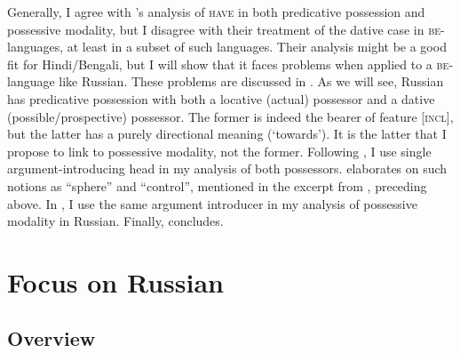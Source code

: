 \documentclass[output=paper,colorlinks,citecolor=brown,modfonts,nonflat]{langsci/langscibook}
\begin{document}
Generally, I agree with \citeauthor{BjorkmanCowper2016}’s analysis of \textsc{have} in both predicative possession and possessive modality, but I disagree with their treatment of the dative case in \textsc{be}{}-languages, at least in a subset of such languages. Their analysis might be a good fit for Hindi/Bengali, but I will show that it faces problems when applied to a \textsc{be}-language like Russian. These problems are discussed in . As we will see, Russian has predicative possession with both a locative (actual) possessor and a dative (possible/prospective) possessor. The former is indeed the bearer of feature [\textsc{incl}], but the latter has a purely directional meaning (‘towards’). It is the latter that I propose to link to possessive modality, not the former. Following \citet{TsedrykInPress}, I use  single argument-introducing head in my analysis of both possessors.  elaborates on such notions as “sphere” and “control”, mentioned in the excerpt from \citet{BjorkmanCowper2016}, preceding  above. In , I use the same argument introducer in my analysis of possessive modality in Russian. Finally,  concludes.

\section{ Focus on Russian}\label{sec:tsedryk:2}

\subsection{Overview}\label{sec:tsedryk:2.1}
\end{document}

